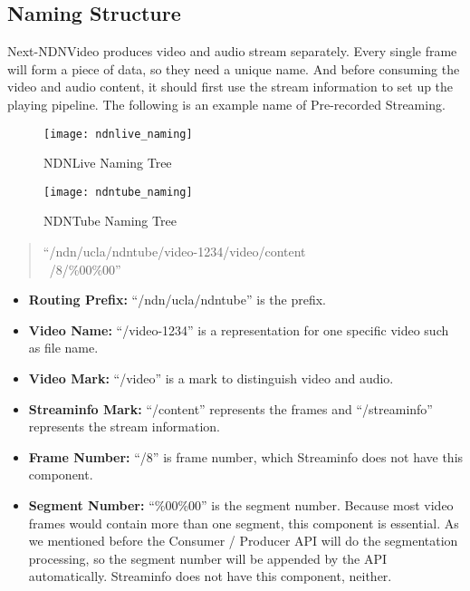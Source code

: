 \subsection{Naming Structure}
Next-NDNVideo produces video and audio stream separately. Every single frame will form a piece of data, so they need a unique name. And before consuming the video and audio content, it should first use the stream information to set up the playing pipeline. The following is an example name of Pre-recorded Streaming. 
\begin{figure}%
  \centering
  \texttt{[image: ndnlive\_naming]}
  \caption{NDNLive Naming Tree}
  \label{fig:ndnlive_naming}
\end{figure}

\begin{figure}%
  \centering
  \texttt{[image: ndntube\_naming]}
  \caption{NDNTube Naming Tree}
  \label{fig:ndntube_naming}
\end{figure}

\begin{quote}
``/ndn/ucla/ndntube/video-1234/video/content \\\ /8/\%00\%00''
\end{quote}
\begin{itemize}
	\item{\textbf{Routing Prefix:}} ``/ndn/ucla/ndntube'' is the prefix.
	\item{\textbf{Video Name:}} ``/video-1234'' is a representation for one specific video such as file name.
	\item{\textbf{Video Mark:}} ``/video'' is a mark to distinguish video and audio.
	\item{\textbf{Streaminfo Mark:}} ``/content'' represents the frames and ``/streaminfo'' represents the stream information.
	\item{\textbf{Frame Number:}} ``/8'' is frame number, which Streaminfo does not have this component.
	\item{\textbf{Segment Number:}} ``\%00\%00'' is the segment number. Because most video frames would contain more than one segment, this component is essential. As we mentioned before the Consumer / Producer API will do the segmentation processing, so the segment number will be appended by the API automatically. Streaminfo does not have this component, neither.
\end{itemize}

